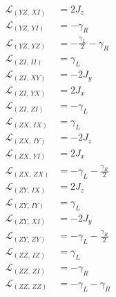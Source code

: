 \documentclass[11pt]{article}
\begin{document}
\begin{align*}
  \mathcal{L}_{(YZ,\,XI)} &= 2 J_{z} \\
  \mathcal{L}_{(YZ,\,YI)} &= - \gamma_{R} \\
  \mathcal{L}_{(YZ,\,YZ)} &= - \frac{\gamma_{L}}{2} - \gamma_{R} \\
  \mathcal{L}_{(ZI,\,II)} &= \gamma_{L} \\
  \mathcal{L}_{(ZI,\,XY)} &= - 2 J_{y} \\
  \mathcal{L}_{(ZI,\,YX)} &= 2 J_{x} \\
  \mathcal{L}_{(ZI,\,ZI)} &= - \gamma_{L} \\
  \mathcal{L}_{(ZX,\,IX)} &= \gamma_{L} \\
  \mathcal{L}_{(ZX,\,IY)} &= - 2 J_{z} \\
  \mathcal{L}_{(ZX,\,YI)} &= 2 J_{x} \\
  \mathcal{L}_{(ZX,\,ZX)} &= - \gamma_{L} - \frac{\gamma_{R}}{2} \\
  \mathcal{L}_{(ZY,\,IX)} &= 2 J_{z} \\
  \mathcal{L}_{(ZY,\,IY)} &= \gamma_{L} \\
  \mathcal{L}_{(ZY,\,XI)} &= - 2 J_{y} \\
  \mathcal{L}_{(ZY,\,ZY)} &= - \gamma_{L} - \frac{\gamma_{R}}{2} \\
  \mathcal{L}_{(ZZ,\,IZ)} &= \gamma_{L} \\
  \mathcal{L}_{(ZZ,\,ZI)} &= - \gamma_{R} \\
  \mathcal{L}_{(ZZ,\,ZZ)} &= - \gamma_{L} - \gamma_{R}
\end{align*}
\end{document}
